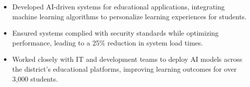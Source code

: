 \divider

\par\smallskip
\noindent
\begin{minipage}{20cm}
  \begin{minipage}{9.75cm}
    \begin{itemize}
      \item Developed AI-driven systems for educational applications, integrating machine learning algorithms to personalize learning experiences for students.
      \item Ensured systems complied with security standards while optimizing performance, leading to a 25\% reduction in system load times.
    \end{itemize}
  \end{minipage}
  \hfill
  \begin{minipage}{9.75cm}
    \begin{itemize}
      \item Worked closely with IT and development teams to deploy AI models across the district’s educational platforms, improving learning outcomes for over 3,000 students.
    \end{itemize}
  \end{minipage}
\end{minipage}
\par

\divider


